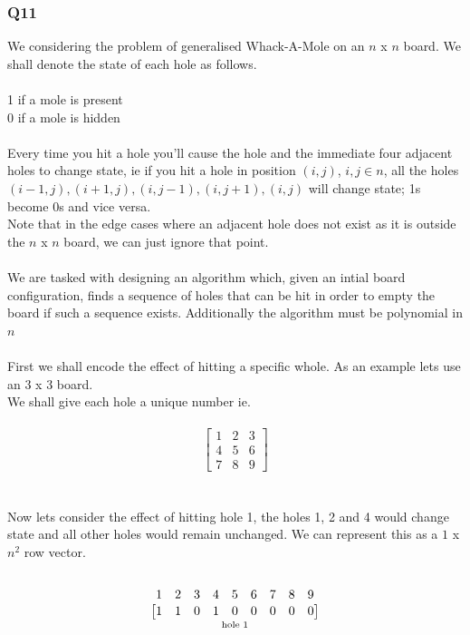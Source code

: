 \documentclass[11pt,a4paper]{article}
\begin{document}
\subsubsection{Q11}
We considering the problem of generalised Whack-A-Mole on an $n$ x $n$ board. We shall denote the state of each hole as follows.
\\\\
1 if a mole is present
\\0 if a mole is hidden
\\\\
Every time you hit a hole you'll cause the hole and the immediate four adjacent holes to change state, ie if you hit a hole in position $(i,j)$, $i, j \in n$, all the holes $(i-1, j), (i+1,j), (i,j-1), (i,j+1), (i,j)$ will change state; 1s become 0s and vice versa.\\
Note that in the edge cases where an adjacent hole does not exist as it is outside the $n$ x $n$ board, we can just ignore that point.
\\\\
We are tasked with designing an algorithm which, given an intial board configuration, finds a sequence of holes that can be hit in order to empty the board if such a sequence exists. Additionally the algorithm must be polynomial in $n$
\\\\
First we shall encode the effect of hitting a specific whole.
As an example lets use an $3$ x $3$ board.\\
We shall give each hole a unique number ie.\\\\
\begin{equation}
\begin{bmatrix}
1 & 2 & 3 \\
4 & 5 & 6 \\
7 & 8 & 9
\end{bmatrix}
\end{equation}
\\\\
Now lets consider the effect of hitting hole 1, the holes 1, 2 and 4 would change state and all other holes would remain unchanged. We can represent this as a $1$ x $n^2$ row vector.\\\\
\[
\overset{\begin{matrix}
1 & 2 & 3 & 4 & 5 & 6 & 7 & 8 & 9
\end{matrix}}
{\underset{\text{hole }1}{
\begin{bmatrix}
1 & 1 & 0 & 1 & 0 & 0 & 0 & 0 & 0
\end{bmatrix}
}}
\\\\
\]
\end{document}
